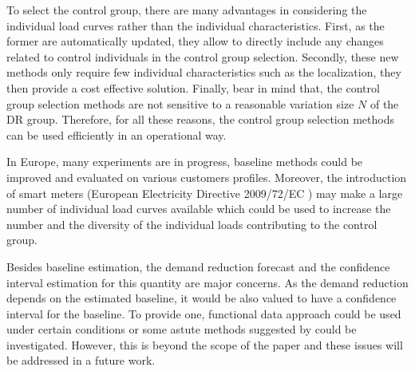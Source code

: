 \documentclass[journal]{IEEEtran}
\begin{document}
To select the control group, there are many advantages in considering the individual 
load curves rather than the individual 
characteristics. First, as the former are automatically updated, they allow to directly 
include any changes related to control individuals in the control group selection. Secondly, 
these new methods only require few individual characteristics such as the localization, they 
then provide a cost effective solution. Finally, bear in mind that, the control group selection 
methods are not sensitive to a reasonable variation size $N$ of the DR group. 
Therefore, for all these reasons, the control group selection methods can be used efficiently in 
an operational way.

In Europe, many experiments are in progress, baseline methods could be 
improved and evaluated on various customers profiles. Moreover, the introduction of 
smart meters (European Electricity Directive 2009/72/EC \cite{EC_2009}) may make 
a large number of individual load curves available which could be used to increase the 
number and the diversity of the individual loads contributing to the control group.

Besides baseline estimation, the demand reduction forecast and the confidence 
interval estimation for this quantity are major concerns. As the demand reduction 
depends on the estimated baseline, it would be also valued to have a confidence 
interval for the baseline. To provide one, functional data approach could be used 
under certain conditions or some astute methods suggested by \cite{interval} could 
be investigated. However, this is beyond the scope of the paper and these issues 
will be addressed in a future work.
 
\end{document}
